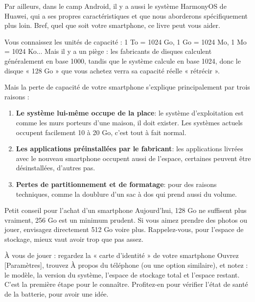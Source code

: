 Par ailleurs, dans le camp Android, il y a aussi le système HarmonyOS de Huawei, qui a ses propres caractéristiques et que nous aborderons spécifiquement plus loin. Bref, quel que soit votre smartphone, ce livre peut vous aider.


Vous connaissez les unités de capacité : 1 To = 1024 Go, 1 Go = 1024 Mo, 1 Mo = 1024 Ko... Mais il y a un piège : les fabricants de disques calculent généralement en base 1000, tandis que le système calcule en base 1024, donc le disque « 128 Go » que vous achetez verra sa capacité réelle « rétrécir ».

Mais la perte de capacité de votre smartphone s'explique principalement par trois raisons :

\begin{enumerate}
  \item \textbf{Le système lui-même occupe de la place}: le système d'exploitation est comme les murs porteurs d'une maison, il doit exister. Les systèmes actuels occupent facilement 10 à 20 Go, c'est tout à fait normal.
  \item \textbf{Les applications préinstallées par le fabricant}: les applications livrées avec le nouveau smartphone occupent aussi de l'espace, certaines peuvent être désinstallées, d'autres pas.
  \item \textbf{Pertes de partitionnement et de formatage}: pour des raisons techniques, comme la doublure d'un sac à dos qui prend aussi du volume.
\end{enumerate}

\begin{tcbinfo}{Petit conseil pour l'achat d'un smartphone}
Aujourd'hui, 128 Go ne suffisent plus vraiment, 256 Go est un minimum prudent. Si vous aimez prendre des photos ou jouer, envisagez directement 512 Go voire plus. Rappelez-vous, pour l'espace de stockage, mieux vaut avoir trop que pas assez.

\end{tcbinfo}

\begin{tcbpractice}{À vous de jouer : regardez la « carte d'identité » de votre smartphone}
Ouvrez [Paramètres], trouvez À propos du téléphone (ou une option similaire), et notez : le modèle, la version du système, l'espace de stockage total et l'espace restant. C'est la première étape pour le connaître. Profitez-en pour vérifier l'état de santé de la batterie, pour avoir une idée.

\end{tcbpractice}

